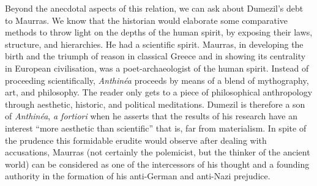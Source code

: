 \begin{quotex}
Beyond the anecdotal aspects of this relation, we can ask about Dumezil's debt to Maurras. We know that the historian would elaborate some comparative methods to throw light on the depths of the human spirit, by exposing their laws, structure, and hierarchies. He had a scientific spirit. Maurras, in developing the birth and the triumph of reason in classical Greece and in showing its centrality in European civilisation, was a poet-archaeologist of the human spirit. Instead of proceeding scientifically, \emph{Anthinéa} proceeds by means of a blend of mythography, art, and philosophy. The reader only gets to a piece of philosophical anthropology through aesthetic, historic, and political meditations. Dumezil is therefore a son of \emph{Anthinéa}, \emph{a fortiori} when he asserts that the results of his research have an interest ``more aesthetic than scientific'' that is, far from materialism. In spite of the prudence this formidable erudite would observe after dealing with accusations, Maurras (not certainly the polemicist, but the thinker of the ancient world) can be considered as one of the intercessors of his thought and a founding authority in the formation of his anti-German and anti-Nazi prejudice.
\end{quotex}


